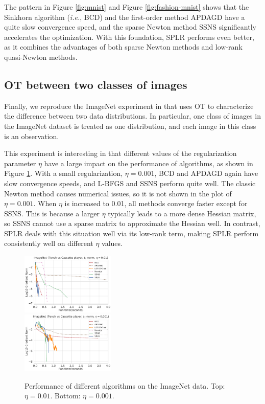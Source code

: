\documentclass{article}
\theoremstyle{plain}
\theoremstyle{definition}
\theoremstyle{remark}
\begin{document}
The pattern in Figure \ref{fig:mnist} and Figure \ref{fig:fashion-mnist} shows that the Sinkhorn algorithm (\emph{i.e.}, BCD) and the first-order method APDAGD have a quite slow convergence speed, and the sparse Newton method SSNS significantly accelerates the optimization. With this foundation, SPLR performs even better, as it combines the advantages of both sparse Newton methods and low-rank quasi-Newton methods.



\subsection{OT between two classes of images}

Finally, we reproduce the ImageNet experiment in \citet{tang2024safe} that uses OT to characterize the difference between two data distributions. In particular, one class of images in the ImageNet dataset \citep{deng2009imagenet} is treated as one distribution, and each image in this class is an observation.

This experiment is interesting in that different values of the regularization parameter $\eta$ have a large impact on the performance of algorithms, as shown in Figure \ref{fig:imagenet}. With a small regularization, $\eta=0.001$, BCD and APDAGD again have slow convergence speeds, and L-BFGS and SSNS perform quite well.
The classic Newton method causes numerical issues, so it is not shown in the plot of $\eta=0.001$.
When $\eta$ is increased to 0.01, all methods converge faster except for SSNS. This is because a larger $\eta$ typically leads to a more dense Hessian matrix, so SSNS cannot use a sparse matrix to approximate the Hessian well. In contrast, SPLR deals with this situation well via its low-rank term, making SPLR perform consistently well on different $\eta$ values.

\begin{figure}[ht]
  \centering
  \includegraphics[width=0.4\textwidth]{save/ImageNet/run_times/CLASS1=tench, CLASS2=cassette player, dim=30, norm=l1, reg=0.01}\\
  \includegraphics[width=0.4\textwidth]{save/ImageNet/run_times/CLASS1=tench, CLASS2=cassette player, dim=30, norm=l1, reg=0.001}
  \caption{Performance of different algorithms on the ImageNet data. Top: $\eta=0.01$. Bottom: $\eta=0.001$.}
  \label{fig:imagenet}
\end{figure}
\end{document}
